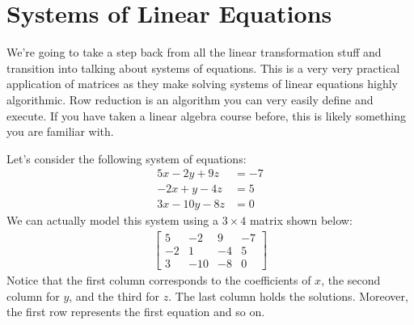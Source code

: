 \section{Systems of Linear Equations}
We're going to take a step back from all the linear transformation stuff and transition into talking about systems of equations. This is a very very practical application of matrices as they make solving systems of linear equations highly algorithmic. Row reduction is an algorithm you can very easily define and execute. If you have taken a linear algebra course before, this is likely something you are familiar with. 

Let's consider the following system of equations:
\begin{align*}
    5x-2y+9z&=-7\\
    -2x+y-4z&=5\\
    3x-10y-8z&=0
\end{align*}
We can actually model this system using a $3\times 4$ matrix shown below:
\begin{align*}
    \left[\begin{array}{ccc|c}
        5 & -2 & 9 & -7 \\
        -2 & 1 & -4 & 5 \\
        3 & -10 & -8 & 0
    \end{array}\right]
\end{align*}
Notice that the first column corresponds to the coefficients of $x$, the second column for $y$, and the third for $z$. The last column holds the solutions. Moreover, the first row represents the first equation and so on.

